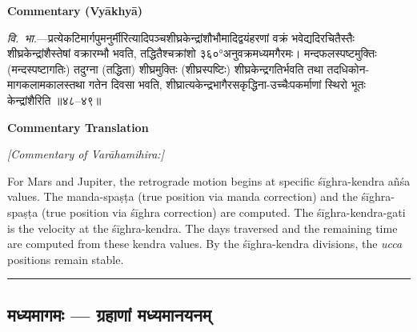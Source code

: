 \documentclass[11pt,a4paper]{article}
\newcommand{\longline}{\noindent\rule{\textwidth}{0.4pt}}
\newcommand{\dev}[1]{{\devanagarifont #1}}
\newcommand{\sectsep}{\par\vspace{0.8em}\longline\vspace{0.8em}}
\begin{document}
\vspace{0.5em}
\begin{minipage}[t]{0.48\textwidth}
\textbf{\small Commentary (Vy\=akhy\=a)}

\small\devanagarifont
\textit{वि.~भा.}---प्रत्येकटिमार्गपुमनुर्मीरित्यादिपञ्चशीघ्रकेन्‍द्रांशौभौमादिद्वयंहरणां वक्रं भवेद्यदिरचितैस्तैः शीघ्रकेन्‍द्रांशैस्तेषां वक्रारम्भौ भवति, तद्धितैश्चक्रांशो ३६०°अनुवक्रमध्यमगैरमः। मन्दफलस्पष्टमुक्तिः (मन्दस्पष्टागतिः) तदुग्ना (तद्धिता) शीघ्रमुक्तिः (शीघ्रस्पष्टिः) शीघ्रकेन्‍द्रगतिर्भवति तथा तदधिकोन-मागकलामकालस्तथा गतेन दिवसा भवति, शीघ्रात्यकेन्‍द्रभागैरसकृद्धिना-उच्चैःपकर्माणां स्थिरो भूतः केन्‍द्रांशैरिति ॥४८--४९॥
\end{minipage}%
\hfill
\begin{minipage}[t]{0.48\textwidth}
\textbf{\small Commentary Translation}

\textit{[Commentary of Var\=ahamihira:]}

For Mars and Jupiter, the retrograde motion begins at specific \'s\=ighra-kendra a\~n\'sa values. The manda-spa\d{s}\d{t}a (true position via manda correction) and the \'s\=ighra-spa\d{s}\d{t}a (true position via \'s\=ighra correction) are computed. The \'s\=ighra-kendra-gati is the velocity at the \'s\=ighra-kendra. The days traversed and the remaining time are computed from these kendra values. By the \'s\=ighra-kendra divisions, the \textit{ucca} positions remain stable.
\end{minipage}

\sectsep

\subsection{\dev{मध्यमागमः --- ग्रहाणां मध्यमानयनम्}}
\label{subsec:madhyamagama}
\end{document}
